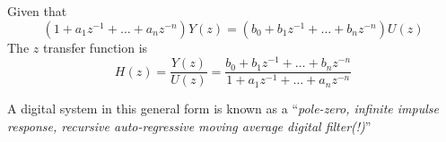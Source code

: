 Given that
\[(1 +
a_{1}z^{-1} + \ldots +  a_n z^{-n}) Y(z) = (b_0 + b_1 z^{-1} +
\ldots + b_n z^{-n}) U(z)\] The $z$ transfer function is
\[H(z) = \frac{Y(z)}{U(z)}=\frac{b_0 + b_{1}z^{-1} + \ldots + b_n
z^{-n}}{1 + a_1z^{-1} + \ldots + a_n z^{-n}}\]

A digital system in this general form is known as a
``\emph{pole-zero, infinite impulse response, recursive
auto-regressive moving average digital filter(!)}''
\endinput
